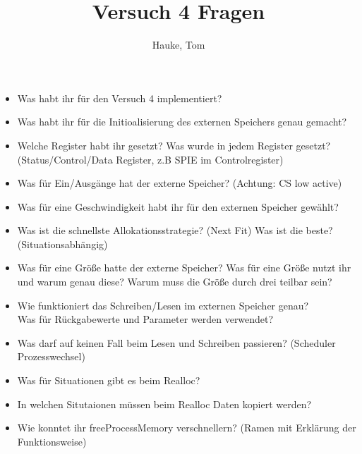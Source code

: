 \documentclass[12pt,a4paper]{article}
\title{Versuch 4 Fragen}
\author{Hauke, Tom}
\begin{document}
\maketitle

\begin{itemize}
    \item Was habt ihr für den Versuch 4 implementiert?
    \item Was habt ihr für die Initioalisierung des externen Speichers genau gemacht?
    \item Welche Register habt ihr gesetzt? Was wurde in jedem Register gesetzt? (Status/Control/Data Register, z.B SPIE im Controlregister) 
    \item Was für Ein/Ausgänge hat der externe Speicher? (Achtung: CS low active)
    \item Was für eine Geschwindigkeit habt ihr für den externen Speicher gewählt?
    \item Was ist die schnellste Allokationsstrategie? (Next Fit) Was ist die beste? (Situationsabhängig)
    \item Was für eine Größe hatte der externe Speicher? Was für eine Größe nutzt ihr und warum genau diese? Warum muss die Größe durch drei teilbar sein?
    \item Wie funktioniert das Schreiben/Lesen im externen Speicher genau?\\ Was für Rückgabewerte und Parameter werden verwendet?
    \item Was darf auf keinen Fall beim Lesen und Schreiben passieren? (Scheduler Prozesswechsel)
    \item Was für Situationen gibt es beim Realloc? 
    \item In welchen Situtaionen müssen beim Realloc Daten kopiert werden? 
    \item Wie konntet ihr freeProcessMemory verschnellern? (Ramen mit Erklärung der Funktionsweise)
\end{itemize}
\end{document}
